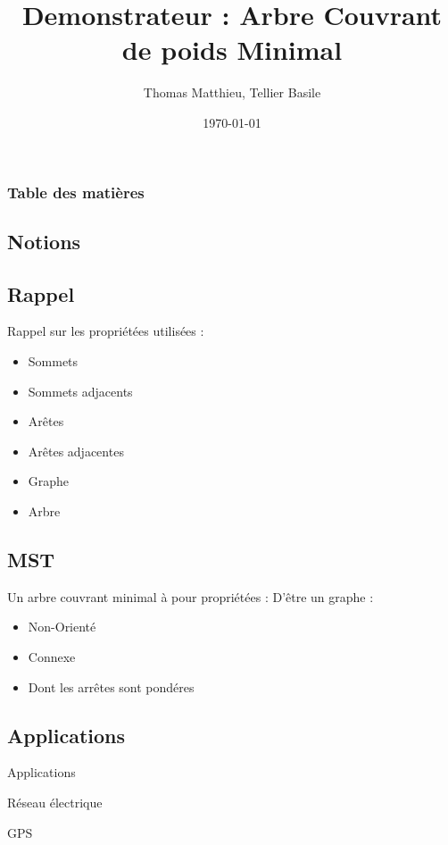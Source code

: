 \documentclass[10pt]{beamer}
\author{Thomas Matthieu, Tellier Basile}
\date{\today}
\title{Demonstrateur : Arbre Couvrant de poids Minimal}
\begin{document}
\begin{frame}
\maketitle

\end{frame}

\begin{frame}
\frametitle{Table des matières}
\tableofcontents
\end{frame}


\begin{frame}
\section{Notions}
\subsection{Rappel}
Rappel sur les propriétées utilisées :
  \begin{itemize}
     \item<1-> Sommets
     \item<1-> Sommets adjacents
     \item<2-> Arêtes
     \item<2-> Arêtes adjacentes
     \item<3-> Graphe
     \item<4-> Arbre
  \end{itemize}

\end{frame}

\begin{frame}
\subsection{MST}
Un arbre couvrant minimal à pour propriétées :
\newline
D'être un graphe :
  \begin{itemize}
     \item<1-> Non-Orienté
     \item<2-> Connexe
     \item<3-> Dont les arrêtes sont pondéres
  \end{itemize}

\end{frame}

\begin{frame}
\section{Applications}
Applications

\begin{examples}
  Réseau électrique
\end{examples}

\begin{examples}
  GPS
\end{examples}

\end{frame}
\end{document}
